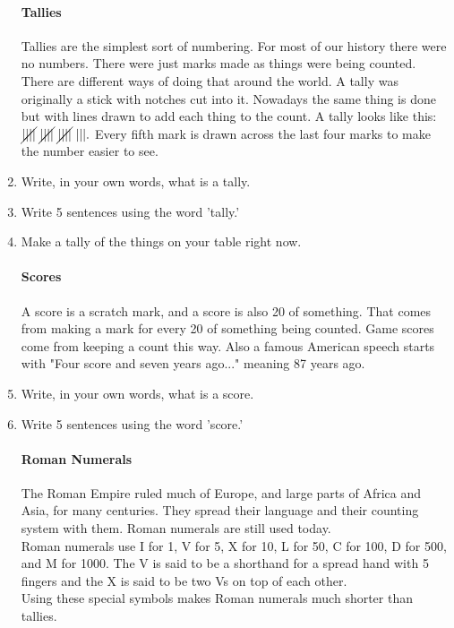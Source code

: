 \documentclass[12pt]{article}
\begin{document}
\begin{enumerate}
\paragraph{Tallies} Tallies are the simplest sort of numbering. For most of our history there were no numbers. There were just marks made as things were being counted. There are different ways of doing that around the world. A tally was originally a stick with notches cut into it. Nowadays the same thing is done but with lines drawn to add each thing to the count. A tally looks like this: $\cancel{||||}\ \cancel{||||}\ \cancel{||||}\ |||.$ Every fifth mark is drawn across the last four marks to make the number easier to see.

\item Write, in your own words, what is a tally.
\item Write 5 sentences using the word 'tally.'
\item Make a tally of the things on your table right now.

\paragraph{Scores}
A score is a scratch mark, and a score is also 20 of something. That comes from making a mark for every 20 of something being counted. Game scores come from keeping a count this way. Also a famous American speech starts with "Four score and seven years ago..." meaning 87 years ago.

\item Write, in your own words, what is a score.
\item Write 5 sentences using the word 'score.'

\paragraph{Roman Numerals} The Roman Empire ruled much of Europe, and large parts of Africa and Asia, for many centuries. They spread their language and their counting system with them. Roman numerals are still used today.\\

Roman numerals use I for 1, V for 5, X for 10, L for 50, C for 100, D for 500, and M for 1000. The V is said to be a shorthand for a spread hand with 5 fingers and the X is said to be two Vs on top of each other.\\

Using these special symbols makes Roman numerals much shorter than tallies.\\


\end{enumerate}
\end{document}
